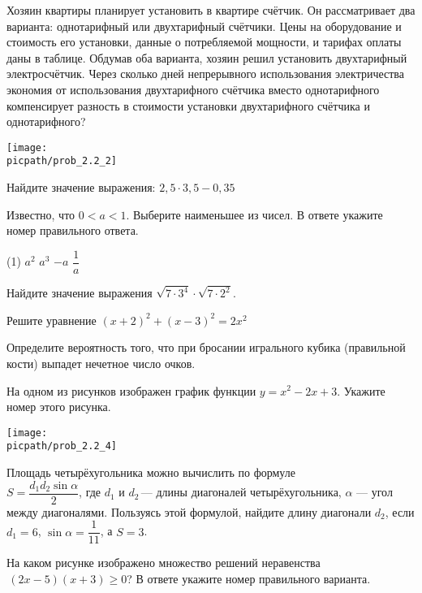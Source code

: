 \begin{training}[1]
\begin{listofex}
			Хозяин квартиры планирует установить в квартире счётчик. Он рассматривает два варианта: однотарифный или двухтарифный счётчики. Цены на оборудование и стоимость его установки, данные о потребляемой мощности, и тарифах оплаты даны в таблице.
			Обдумав оба варианта, хозяин решил установить двухтарифный электросчётчик. Через сколько дней непрерывного использования электричества экономия от использования двухтарифного счётчика вместо однотарифного компенсирует разность в стоимости установки двухтарифного счётчика и однотарифного?
			\foranswer
		\gapwidth
		\begin{center}
			\texttt{[image: \\picpath/prob\_2.2\_2]}
		\end{center}
		\item Найдите значение выражения: \( 2,5\cdot3,5-0,35 \)
		\foranswer
		\item Известно, что \( 0<a<1 \). Выберите наименьшее из чисел. В ответе укажите номер правильного ответа.
		\begin{tasks}(1)
			\task \( a^2 \)
			\task \( a^3 \)
			\task \( -a \)
			\task \( \dfrac{1}{a} \)
		\end{tasks}
		\foranswer
		\item Найдите значение выражения \( \sqrt{7\cdot3^4}\cdot\sqrt{7\cdot2^2} \).
		\foranswer
		\item Решите уравнение \( (x+2)^2+(x-3)^2=2x^2 \)
		\foranswer
		\hphantom{Часть 1}
		\item Определите вероятность того, что при бросании игрального кубика (правильной кости) выпадет нечетное число очков.
		\foranswer
		\item На одном из рисунков изображен график функции \( y=x^2-2x+3 \). Укажите номер этого рисунка.
		\begin{center}
			\texttt{[image: \\picpath/prob\_2.2\_4]}
		\end{center}
		\foranswer
		\item Площадь четырёхугольника можно вычислить по формуле \\ \( S=\dfrac{d_1d_2\sin\alpha}{2} \),  где \( d_1 \) и \( d_2 \) --- длины диагоналей четырёхугольника, \( \alpha \) --- угол между диагоналями. Пользуясь этой формулой, найдите длину диагонали \( d_2 \), если \( d_1=6 \), \( \sin\alpha=\dfrac{1}{11} \), а \( S=3 \).
		\foranswer
			\end{listofex}
		\newpage
		\begin{listofex}[resume]
		\item На каком рисунке изображено множество решений неравенства\\ \( (2x-5)(x+3)\ge0 \)? В ответе укажите номер правильного варианта.

\end{listofex}
\end{training}
